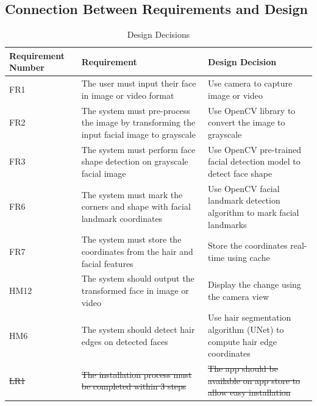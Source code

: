 \documentclass[12pt, titlepage]{article}
\begin{document}
\newpage
\subsection{Connection Between Requirements and Design} \label{SecConnection}

\begin{table}[h]
\caption{Design Decisions} \label{TblDecisions}
\begin{tabularx}{\textwidth}{p{2.5cm}p{6cm}X}
\toprule
\textbf{Requirement Number} & \textbf{Requirement} & \textbf{Design Decision}\\
\midrule
FR1 & The user must input their face in image or video format & Use camera to capture image or video\\
\midrule
FR2 & The system must pre-process the image by transforming the input facial image to grayscale & Use OpenCV library to convert the image to grayscale\\
\midrule
FR3 & The system must perform face shape detection on grayscale facial image & Use OpenCV pre-trained facial detection model to detect face shape\\
\midrule
FR6 & The system must mark the corners and shape with facial landmark coordinates & Use OpenCV facial landmark detection algorithm to mark facial landmarks\\
\midrule
FR7 & The system must store the coordinates from the hair and facial features & Store the coordinates real-time using cache\\
\midrule
HM12 & The system should output the transformed face in image or video & Display the change using the camera view\\
\midrule
HM6 & The system should detect hair edges on detected faces & Use hair segmentation algorithm (UNet) to compute hair edge coordinates\\
\midrule
\sout{LR1} & \sout{The installation process must be completed within 3 steps} & \sout{The app should be available on app store to allow easy installation}\\

\bottomrule
\end{tabularx}
\end{table}
\newpage
\end{document}
